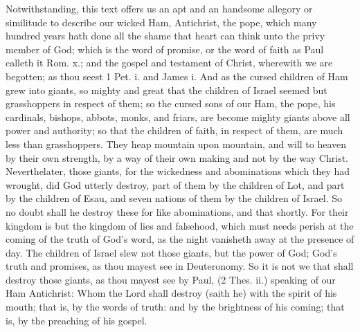 Notwithstanding, this text offers us an apt and an handsome
allegory or similitude to describe our wicked Ham, 
Antichrist, the pope, which many hundred years hath done 
all the shame that heart can think unto the privy member 
of God; which is the word of promise, or the word of 
faith as Paul calleth it Rom. x.; and the gospel and testament
of Christ, wherewith we are begotten; as thou 
seest 1 Pet. i. and James i. And as the cursed children 
of Ham grew into giants, so mighty and great that the 
children of Israel seemed but grasshoppers in respect of 
them; so the cursed sons of our Ham, the pope, his cardinals,
bishops, abbots, monks, and friars, are become 
mighty giants above all power and authority; so that the 
children of faith, in respect of them, are much less than 
grasshoppers. They heap mountain upon mountain, and 
will to heaven by their own strength, by a way of their own 
making and not by the way Christ. Neverthelater, 
those giants, for the wickedness and abominations which 
they had wrought, did God utterly destroy, part of them 
by the children of Lot, and part by the children of Esau, 
and seven nations of them by the children of Israel. So 
no doubt shall he destroy these for like abominations, and 
that shortly. For their kingdom is but the kingdom of 
lies and falsehood, which must needs perish at the coming
of the truth of God's word, as the night vanisheth away 
at the presence of day. The children of Israel slew not 
those giants, but the power of God; God's truth and promises,
as thou mayest see in Deuteronomy. So it is not we 
that shall destroy those giants, as thou mayest see by Paul, 
(2 Thes. ii.) speaking of our Ham Antichrist: Whom the 
Lord shall destroy (saith he) with the spirit of his mouth; 
that is, by the words of truth: and by the brightness of his 
coming; that is, by the preaching of his gospel. 

